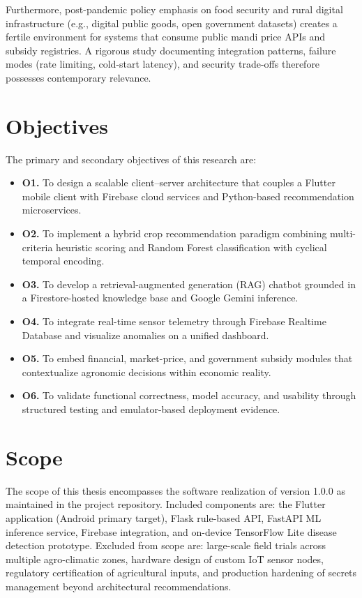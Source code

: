 Furthermore, post-pandemic policy emphasis on food security and rural digital infrastructure (e.g., digital public goods, open government datasets) creates a fertile environment for systems that consume public mandi price APIs and subsidy registries. A rigorous study documenting integration patterns, failure modes (rate limiting, cold-start latency), and security trade-offs therefore possesses contemporary relevance.

\section{Objectives}
\label{sec:objectives}

The primary and secondary objectives of this research are:

\begin{itemize}
  \item \textbf{O1.} To design a scalable client--server architecture that couples a Flutter mobile client with Firebase cloud services and Python-based recommendation microservices.
  \item \textbf{O2.} To implement a hybrid crop recommendation paradigm combining multi-criteria heuristic scoring and Random Forest classification with cyclical temporal encoding.
  \item \textbf{O3.} To develop a retrieval-augmented generation (RAG) chatbot grounded in a Firestore-hosted knowledge base and Google Gemini inference.
  \item \textbf{O4.} To integrate real-time sensor telemetry through Firebase Realtime Database and visualize anomalies on a unified dashboard.
  \item \textbf{O5.} To embed financial, market-price, and government subsidy modules that contextualize agronomic decisions within economic reality.
  \item \textbf{O6.} To validate functional correctness, model accuracy, and usability through structured testing and emulator-based deployment evidence.
\end{itemize}

\section{Scope}
\label{sec:scope}

The scope of this thesis encompasses the software realization of \HydroSmart{} version 1.0.0 as maintained in the project repository. Included components are: the Flutter application (Android primary target), Flask rule-based API, FastAPI ML inference service, Firebase integration, and on-device TensorFlow Lite disease detection prototype. Excluded from scope are: large-scale field trials across multiple agro-climatic zones, hardware design of custom IoT sensor nodes, regulatory certification of agricultural inputs, and production hardening of secrets management beyond architectural recommendations.

